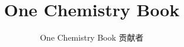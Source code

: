 \documentclass[11pt,a4paper,twoside,openany]{book}
\title{One Chemistry Book}
\author{One Chemistry Book 贡献者}
\date{\bookdate}
\begin{document}
\frontmatter




\tableofcontents

\mainmatter



\appendix
\part{\omsolutionspart}


\backmatter
\renewcommand{\indexspace}{\par\vskip 8pt plus 4pt minus 4pt\relax}
\printindex
\end{document}
